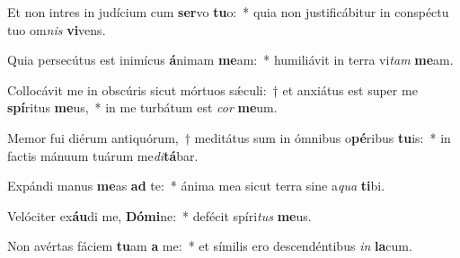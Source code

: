 \item Et non intres in judícium cum \textbf{ser}vo \textbf{tu}o:~* quia non justificábitur in conspéctu tuo om\textit{nis} \textbf{vi}vens.
\item Quia persecútus est inimícus \textbf{á}nimam \textbf{me}am:~* humiliávit in terra vi\textit{tam} \textbf{me}am.
\item Collocávit me in obscúris sicut mórtuos sǽculi:~† et anxiátus est super me \textbf{spí}ritus \textbf{me}us,~* in me turbátum est \textit{cor} \textbf{me}um.
\item Memor fui diérum antiquórum,~† meditátus sum in ómnibus o\textbf{pé}ribus \textbf{tu}is:~* in factis mánuum tuárum me\textit{di}\textbf{tá}bar.
\item Expándi manus \textbf{me}as \textbf{ad} te:~* ánima mea sicut terra sine a\textit{qua} \textbf{ti}bi.
\item Velóciter ex\textbf{áu}di me, \textbf{Dó}\textbf{mi}ne:~* defécit spíri\textit{tus} \textbf{me}us.
\item Non avértas fáciem \textbf{tu}am \textbf{a} me:~* et símilis ero descendéntibus \textit{in} \textbf{la}cum.
